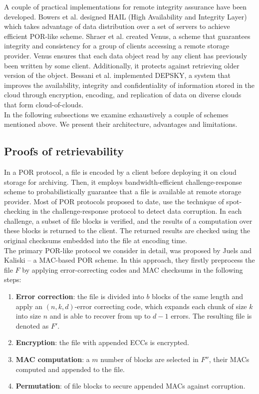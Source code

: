 A couple of practical implementations for remote integrity assurance have been
developed. Bowers et al. \cite{hail} designed HAIL (High Availability and
Integrity Layer) which takes advantage of data distribution over a set of
servers to achieve efficient POR-like scheme. Shraer et al. \cite{venus}
created Venus, a scheme that guarantees integrity and consistency for a group
of clients accessing a remote storage provider. Venus ensures that each data
object read by any client has previously been written by some client.
Additionally, it protects against retrieving older version of the object.
Bessani et al. \cite{depsky} implemented DEPSKY, a system that improves the
availability, integrity and confidentiality of information stored in the cloud
through encryption, encoding, and replication of data on diverse clouds that
form cloud-of-clouds.\\

In the following subsections we examine exhaustively a couple of schemes
mentioned above. We present their architecture, advantages and limitations.

\subsection{Proofs of retrievability}
In a POR \cite{por, por2} protocol, a file is encoded by a client before
deploying it on cloud storage for archiving. Then, it employs
bandwidth-efficient challenge-response scheme to probabilistically guarantee
that a file is available at remote storage provider. Most of POR protocols 
proposed to date, use the technique of spot-checking in the challenge-response
protocol to detect data corruption. In each challenge, a subset of file blocks
is verified, and the results of a computation over these blocks is returned to
the client. The returned results are checked using the original checksums
embedded into the file at encoding time.\\

The primary POR-like protocol we consider in detail, was proposed by Juels and
Kaliski \cite{por} -- a MAC-based POR scheme. In this approach, they firstly
preprocess the file $F$ by applying error-correcting codes and MAC checksums
in the following steps:

\begin{enumerate}
	\item \textbf{Error correction}: the file is divided into $b$ blocks of the
	same length and apply an $(n,k,d)$-error correcting code,
	which expands each chunk of size $k$ into size $n$ and is able to recover
	from up to $d-1$ errors. The resulting file is denoted as $F'$.
	\item \textbf{Encryption}: the file with appended ECCs is encrypted.
	\item \textbf{MAC computation}: a $m$ number of blocks are selected in
	$F''$, their MACs computed and appended to the file.
	\item \textbf{Permutation}: of file blocks to secure appended MACs against
	corruption.
\end{enumerate}

